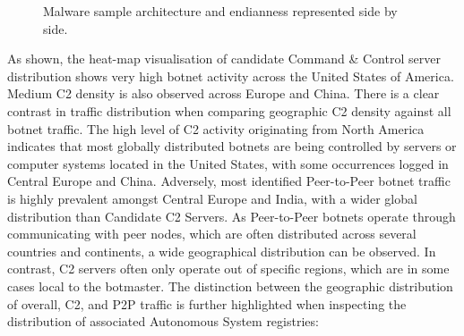 \begin{figure}[!htb]
    \centering
    \qquad
    \caption{Malware sample architecture and endianness represented side by side.}
    \label{fig:p2p_c2_heatmaps}
\end{figure}

As shown, the heat-map visualisation of candidate Command \& Control server distribution shows very high botnet activity across the United States of America. Medium C2 density is also observed across Europe and China. There is a clear contrast in traffic distribution when comparing geographic C2 density against all botnet traffic. The high level of C2 activity originating from North America indicates that most globally distributed botnets are being controlled by servers or computer systems located in the United States, with some occurrences logged in Central Europe and China. Adversely, most identified Peer-to-Peer botnet traffic is highly prevalent amongst Central Europe and India, with a wider global distribution than Candidate C2 Servers. As Peer-to-Peer botnets operate through communicating with peer nodes, which are often distributed across several countries and continents, a wide geographical distribution can be observed. In contrast, C2 servers often only operate out of specific regions, which are in some cases local to the botmaster. The distinction between the geographic distribution of overall, C2, and P2P traffic is further highlighted when inspecting the distribution of associated Autonomous System registries:

